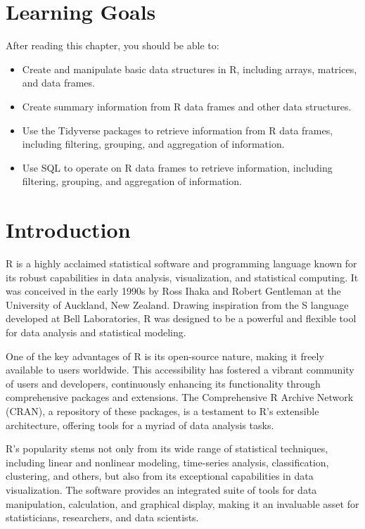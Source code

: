 %
%
\section*{Learning Goals}

After reading this chapter, you should be able to:
\begin{itemize}
   \item Create and manipulate basic data structures in R, including arrays, matrices, and data frames.
   \item Create summary information from R data frames and other data structures.
   \item Use the Tidyverse packages to retrieve information from R data frames, including filtering, grouping, and aggregation of information.
   \item Use SQL to operate on R data frames to retrieve information, including filtering, grouping, and aggregation of information.
\end{itemize}

\section{Introduction}

R is a highly acclaimed statistical software and programming language known for its robust capabilities in data analysis, visualization, and statistical computing. It was conceived in the early 1990s by Ross Ihaka and Robert Gentleman at the University of Auckland, New Zealand. Drawing inspiration from the S language developed at Bell Laboratories, R was designed to be a powerful and flexible tool for data analysis and statistical modeling.

One of the key advantages of R is its open-source nature, making it freely available to users worldwide. This accessibility has fostered a vibrant community of users and developers, continuously enhancing its functionality through comprehensive packages and extensions. The Comprehensive R Archive Network (CRAN), a repository of these packages, is a testament to R's extensible architecture, offering tools for a myriad of data analysis tasks.

R's popularity stems not only from its wide range of statistical techniques, including linear and nonlinear modeling, time-series analysis, classification, clustering, and others, but also from its exceptional capabilities in data visualization. The software provides an integrated suite of tools for data manipulation, calculation, and graphical display, making it an invaluable asset for statisticians, researchers, and data scientists.

